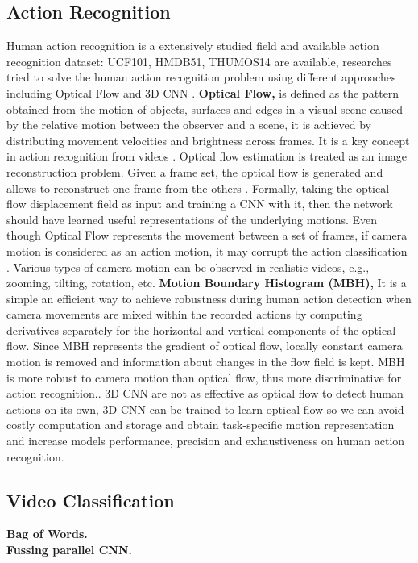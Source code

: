 \documentclass[twocolumn]{article}
\begin{document}
\subsection{Action Recognition}
Human action recognition is a extensively studied field and available action recognition dataset: UCF101, HMDB51, THUMOS14  are available, researches tried to solve the human action recognition problem using different approaches including Optical Flow and 3D CNN \cite{qiu2017learning}.  \textbf{Optical Flow,} is defined as the pattern obtained from the motion of objects, surfaces and edges in a visual scene caused by the relative motion between the observer and a scene, it is achieved by distributing movement velocities and brightness across frames. It is a  key concept in action recognition from videos \cite{wang2019hallucinating}. Optical flow estimation is treated as an image reconstruction problem. Given a frame set, the optical flow is generated and allows to reconstruct one frame from the others \cite{zhu2018hidden}. Formally, taking the optical flow displacement field as input and training a CNN with it, then the network should have learned useful representations of the underlying motions. Even though Optical Flow represents the movement between a set of frames, if camera motion is considered as an action motion, it may corrupt the action classification \cite{wang2013dense}. Various types of camera motion can be observed in realistic videos, e.g., zooming, tilting, rotation, etc. \textbf{Motion Boundary Histogram (MBH),} It is a simple an efficient way to achieve robustness during human action detection when camera movements are mixed within the recorded actions by computing derivatives separately for the horizontal and vertical components of the optical flow. Since MBH represents the gradient of optical flow, locally constant camera motion is removed and information about changes in the flow field is kept. MBH is more robust to camera motion than optical flow, thus more discriminative for action recognition.\cite{wang2013dense}. 3D CNN are not as effective as optical flow to detect human actions on its own, 3D CNN can be trained to learn optical flow so we can avoid costly computation and storage and obtain task-specific motion representation  \cite{zhu2018hidden} and increase models performance, precision and exhaustiveness on human action recognition.
\subsection{Video Classification}
\textbf{Bag of Words.}
\\
\textbf{Fussing parallel CNN.}
\end{document}

